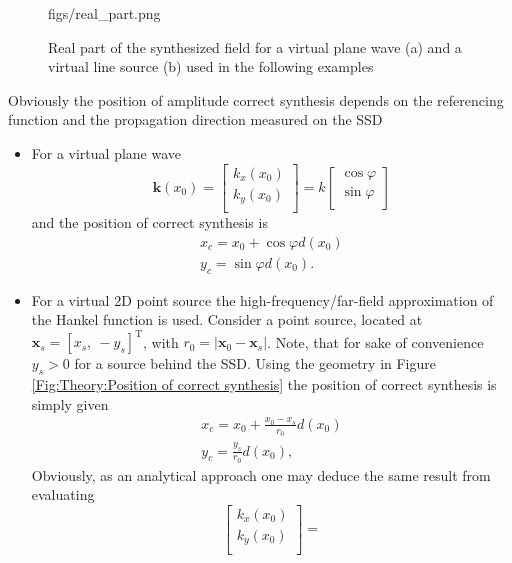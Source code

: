 \documentclass[12pt,a4paper]{article}
\newcommand{\sinfi}{\sin\varphi}
\newcommand{\cosfi}{\cos\varphi}
\newcommand{\vxo}{\mathbf{x}_0}
\begin{document}
\begin{figure}
	\centering
	\begin{overpic}[width = 1\columnwidth ]{figs/real_part.png}
	\scriptsize
	\end{overpic}
\caption{Real part of the synthesized field for a virtual plane wave (a) and a virtual line source (b) used in the following examples}
	\label{Fig:Theory:Real_part}
\end{figure}

Obviously the position of amplitude correct synthesis depends on the referencing function and the propagation direction measured on the SSD
\begin{itemize}
\item For a virtual plane wave 
\begin{equation}
\mathbf{k}(x_0) = \begin{bmatrix} k_x(x_0) \\[0.3em] k_y(x_0)\\[0.3em]    \end{bmatrix} =  k\begin{bmatrix} \cosfi \\[0.3em] \sinfi \\[0.3em]    \end{bmatrix}
\end{equation}
and the position of correct synthesis is 
\begin{eqnarray}
x_c = x_0 + \cosfi d(x_0) \\
y_c = \sinfi d(x_0).
\end{eqnarray}
\item For a virtual 2D point source the high-frequency/far-field approximation of the Hankel function is used. Consider a point source, located at $\mathbf{x}_s = [ x_s,\ -y_s ]^{\mathrm{T}}$, with $r_0 = | \vxo - \mathbf{x}_s |$. Note, that for sake of convenience $y_s>0$ for a source behind the SSD. Using the geometry in Figure \ref{Fig:Theory:Position of correct synthesis} the position of correct synthesis is simply given 
\begin{eqnarray}
x_c = x_0 + \frac{x_0-x_s}{r_0} d(x_0) \\
y_c = \frac{y_s}{r_0} d(x_0),
\end{eqnarray}
Obviously, as an analytical approach one may deduce the same result from evaluating
\begin{equation} 
\begin{bmatrix} k_x(x_0) \\[0.3em] k_y(x_0)\\[0.3em]    \end{bmatrix} = 

\end{equation}
\end{itemize}
\end{document}
